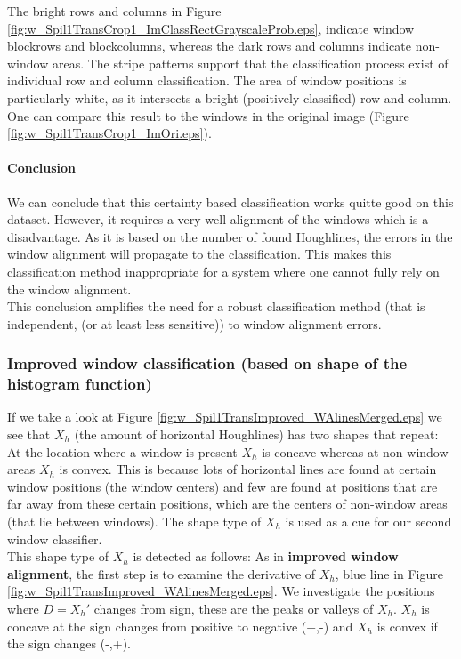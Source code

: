 The bright rows and columns in Figure
\ref{fig:w_Spil1TransCrop1_ImClassRectGrayscaleProb.eps},  indicate window
blockrows and blockcolumns, whereas the dark rows and columns indicate
non-window areas.
The stripe patterns support that the classification process exist of individual
row and column classification.
The area of window positions is particularly white, as it 
intersects a bright (positively classified) row and column.
One can compare this result to the windows in the original image 
(Figure \ref{fig:w_Spil1TransCrop1_ImOri.eps}).


\paragraph{Conclusion}
We can conclude that this certainty based classification works quitte good on
this dataset.  However, it requires a very well alignment of the windows which
is a disadvantage.  As it is based on the number of found Houghlines, the
errors in the window alignment will propagate to the classification.  This
makes this classification method inappropriate for a system where one cannot
fully rely on the window alignment.  \\
This conclusion amplifies the need for a robust classification method (that is
independent, (or at least less sensitive)) to window alignment errors.


\subsubsection{Improved window classification (based on shape of the histogram function)}
If we take a look at Figure \ref{fig:w_Spil1TransImproved_WAlinesMerged.eps}
we see that $X_h$ (the amount of horizontal Houghlines) has two shapes that
repeat:  At the location where a window is present $X_h$ is concave whereas at
non-window areas $X_h$ is convex. This is because lots of
horizontal lines are found at certain window positions (the window centers) and few
are found at positions that are far away from these certain positions, which are the
centers of non-window areas (that lie between windows).  The shape type of $X_h$ is
used as a cue for our second window classifier.\\

This shape type of $X_h$ is detected as follows:
As in \textbf{improved window alignment}, the first step is to examine the
derivative of $X_h$, blue line in Figure
\ref{fig:w_Spil1TransImproved_WAlinesMerged.eps}.  We investigate the positions
where $D=X_{h}'$ changes from sign, these are the peaks or valleys of $X_h$.
$X_h$ is concave at the sign changes from positive to negative (+,-) and $X_h$
is convex if the sign changes (-,+).\\

